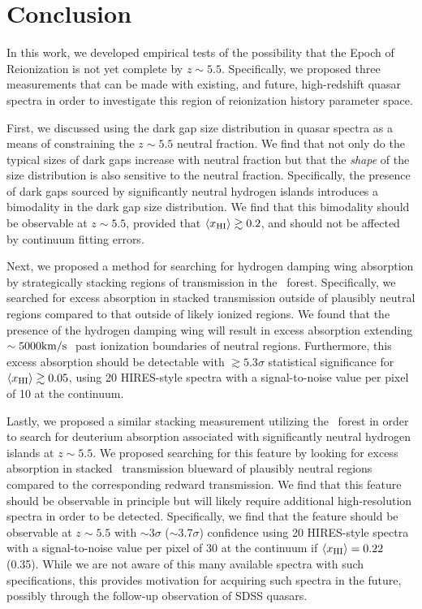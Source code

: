 \section{Conclusion} \label{sec:NeutralIslandsConclusion}


In this work, we developed empirical tests of the possibility that the Epoch of Reionization is not yet complete by $z \sim 5.5$. Specifically, we proposed three measurements that can be made with existing, and future, high-redshift quasar spectra in order to investigate this region of reionization history parameter space. 


First, we discussed using the dark gap size distribution in quasar spectra as a means of constraining the $z \sim 5.5$ neutral fraction. We find that not only do the typical sizes of dark gaps increase with neutral fraction but that the \textit{shape} of the size distribution is also sensitive to the neutral fraction. Specifically, the presence of dark gaps sourced by significantly neutral hydrogen islands introduces a bimodality in the dark gap size distribution. We find that this bimodality should be observable at $z \sim 5.5$, provided that $\langle x_{\text{HI}}\rangle \gtrsim 0.2$, and should not be affected by continuum fitting errors. 


Next, we proposed a method for searching for hydrogen damping wing absorption by strategically stacking regions of transmission in the \lya\ forest. Specifically, we searched for excess absorption in stacked transmission outside of plausibly neutral regions compared to that outside of likely ionized regions. We found that the presence of the hydrogen damping wing will result in excess absorption extending $\sim 5000\text{km}/\text{s}\ $ past ionization boundaries of neutral regions. Furthermore, this excess absorption should be detectable with $\gtrsim 5.3\sigma$ statistical significance for $\langle x_{\text{HI}}\rangle \gtrsim 0.05$, using 20 HIRES-style spectra with a signal-to-noise value per pixel of 10 at the continuum. 


Lastly, we proposed a similar stacking measurement utilizing the \lyb\ forest in order to search for deuterium absorption associated with significantly neutral hydrogen islands at $z \sim 5.5$. We proposed searching for this feature by looking for excess absorption in stacked \lyb\ transmission blueward of plausibly neutral regions compared to the corresponding redward transmission. We find that this feature should be observable in principle but will likely require additional high-resolution spectra in order to be detected. Specifically, we find that the feature should be observable at $z \sim 5.5$ with $\sim3\sigma$ ($\sim 3.7\sigma$) confidence using 20 HIRES-style spectra with a signal-to-noise value per pixel of 30 at the continuum if $\langle x_{\text{HI}}\rangle = 0.22$ (0.35). While we are not aware of this many available spectra with such specifications, this provides motivation for acquiring such spectra in the future, possibly through the follow-up observation of SDSS quasars. 



